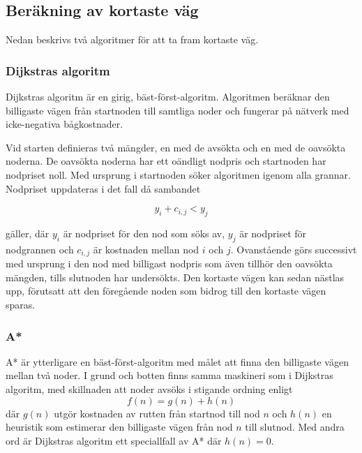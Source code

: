 \documentclass[11pt]{article}
\begin{document}
\begin{flushleft}
\subsection{Beräkning av kortaste väg}
Nedan beskrivs två algoritmer för att ta fram kortaste väg.

\subsubsection{Dijkstras algoritm}
Dijkstras algoritm är en girig, bäst-först-algoritm. Algoritmen beräknar den billigaste vägen från startnoden till samtliga noder och fungerar på nätverk med icke-negativa bågkostnader. 

Vid starten definieras två mängder, en med de avsökta och en med de oavsökta noderna. De oavsökta noderna har ett oändligt nodpris och startnoden har nodpriset noll. Med ursprung i startnoden söker algoritmen igenom alla grannar. Nodpriset uppdateras i det fall då sambandet

\begin{displaymath}
	y_i + c_{i,j} < y_j
\end{displaymath}

gäller, där \begin{math} y_i \end{math} är nodpriset för den nod som söks av, \begin{math} y_j \end{math} är nodpriset för nodgrannen och \begin{math} c_{i,j} \end{math} är kostnaden mellan nod \begin{math} i \end{math} och \begin{math} j \end{math}. Ovanstående görs successivt med ursprung i den nod med billigast nodpris som även tillhör den oavsökta mängden, tills slutnoden har undersökts. Den kortaste vägen kan sedan nästlas upp, förutsatt att den föregående noden som bidrog till den kortaste vägen sparas. 

\subsubsection{A*}
A* är ytterligare en bäst-först-algoritm med målet att finna den billigaste vägen mellan två noder. I grund och botten finns samma maskineri som i Dijkstras algoritm, med skillnaden att noder avsöks i stigande ordning enligt
\begin{equation*}
	f(n) = g(n) + h(n)
\end{equation*}
där $g(n)$ utgör kostnaden av rutten från startnod till nod $n$ och $h(n)$ en heuristik som estimerar den billigaste vägen från nod $n$ till slutnod. Med andra ord är Dijkstras algoritm ett speciallfall av A* där $h(n) = 0$.


\end{flushleft}
\end{document}
